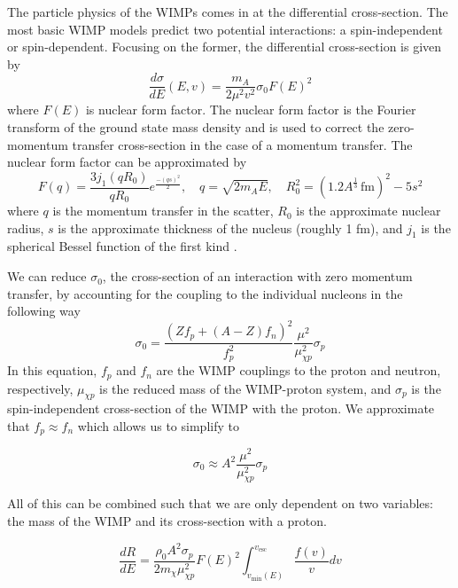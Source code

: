 The particle physics of the WIMPs comes in at the differential cross-section.  The most basic WIMP models predict two potential interactions: a spin-independent or spin-dependent.  Focusing on the former, the differential cross-section is given by
%
\begin{equation}
        \frac{d \sigma}{dE}(E, v) = \frac{m_A}{2 \mu^2 v^2} \sigma_0 F(E)^2
\end{equation}
%
where $F(E)$ is nuclear form factor.  The nuclear form factor is the Fourier transform of the ground state mass density and is used to correct the zero-momentum transfer cross-section in the case of a momentum transfer.  The nuclear form factor can be approximated by
%
\begin{equation}
        F(q) = \frac{3 j_1(q R_0)}{q R_0} e^{\frac{-(qs)^2}{2}}, \quad q=\sqrt{2 m_A E}, \quad R_0^2 = \left( 1.2A^{\frac{1}{3}} \, \textrm{fm} \right)^{2} - 5s^2
\end{equation}
%
where $q$ is the momentum transfer in the scatter, $R_0$ is the approximate nuclear radius, $s$ is the approximate thickness of the nucleus (roughly 1 fm), and $j_1$ is the spherical Bessel function of the first kind \cite{engel1991nuclear}.  

We can reduce $\sigma_0$, the cross-section of an interaction with zero momentum transfer, by accounting for the coupling to the individual nucleons in the following way
%
\begin{equation}
        \sigma_0 = \frac{\left( Z f_p + (A-Z)f_n \right)^2}{f_p^2} \frac{\mu^2}{\mu^2_{\chi p}} \sigma_p
\end{equation}
%
In this equation, $f_p$ and $f_n$ are the WIMP couplings to the proton and neutron, respectively, $\mu_{\chi p}$ is the reduced mass of the WIMP-proton system, and $\sigma_p$ is the spin-independent cross-section of the WIMP with the proton.  We approximate that $f_p \approx f_n$ which allows us to simplify to

\begin{equation}
        \sigma_0 \approx A^2 \frac{\mu^2}{\mu^2_{\chi p}} \sigma_p
\end{equation}

All of this can be combined such that we are only dependent on two variables: the mass of the WIMP and its cross-section with a proton.

\begin{equation}
        \frac{dR}{dE} = \frac{\rho_0 A^2 \sigma_p}{2 m_{\chi} \mu_{\chi p}^2} F(E)^2 \int_{v_{\textrm{min}}(E)}^{v_{\textrm{esc}}}  \frac{f(v)}{v} dv
\end{equation}

